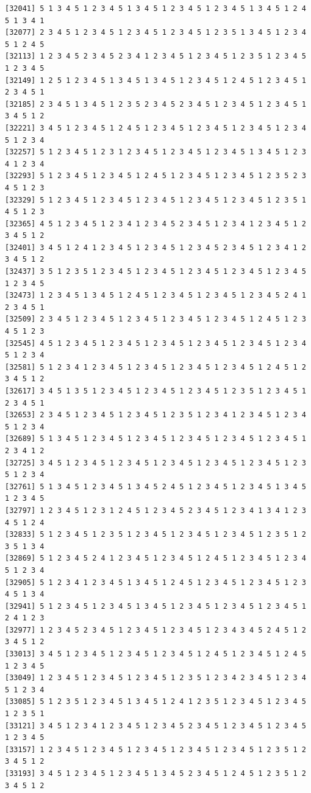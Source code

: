 \documentclass[
  english,
]{book}
\begin{document}
\begin{verbatim}
[32041] 5 1 3 4 5 1 2 3 4 5 1 3 4 5 1 2 3 4 5 1 2 3 4 5 1 3 4 5 1 2 4 5 1 3 4 1
[32077] 2 3 4 5 1 2 3 4 5 1 2 3 4 5 1 2 3 4 5 1 2 3 5 1 3 4 5 1 2 3 4 5 1 2 4 5
[32113] 1 2 3 4 5 2 3 4 5 2 3 4 1 2 3 4 5 1 2 3 4 5 1 2 3 5 1 2 3 4 5 1 2 3 4 5
[32149] 1 2 5 1 2 3 4 5 1 3 4 5 1 3 4 5 1 2 3 4 5 1 2 4 5 1 2 3 4 5 1 2 3 4 5 1
[32185] 2 3 4 5 1 3 4 5 1 2 3 5 2 3 4 5 2 3 4 5 1 2 3 4 5 1 2 3 4 5 1 3 4 5 1 2
[32221] 3 4 5 1 2 3 4 5 1 2 4 5 1 2 3 4 5 1 2 3 4 5 1 2 3 4 5 1 2 3 4 5 1 2 3 4
[32257] 5 1 2 3 4 5 1 2 3 1 2 3 4 5 1 2 3 4 5 1 2 3 4 5 1 3 4 5 1 2 3 4 1 2 3 4
[32293] 5 1 2 3 4 5 1 2 3 4 5 1 2 4 5 1 2 3 4 5 1 2 3 4 5 1 2 3 5 2 3 4 5 1 2 3
[32329] 5 1 2 3 4 5 1 2 3 4 5 1 2 3 4 5 1 2 3 4 5 1 2 3 4 5 1 2 3 5 1 4 5 1 2 3
[32365] 4 5 1 2 3 4 5 1 2 3 4 1 2 3 4 5 2 3 4 5 1 2 3 4 1 2 3 4 5 1 2 3 4 5 1 2
[32401] 3 4 5 1 2 4 1 2 3 4 5 1 2 3 4 5 1 2 3 4 5 2 3 4 5 1 2 3 4 1 2 3 4 5 1 2
[32437] 3 5 1 2 3 5 1 2 3 4 5 1 2 3 4 5 1 2 3 4 5 1 2 3 4 5 1 2 3 4 5 1 2 3 4 5
[32473] 1 2 3 4 5 1 3 4 5 1 2 4 5 1 2 3 4 5 1 2 3 4 5 1 2 3 4 5 2 4 1 2 3 4 5 1
[32509] 2 3 4 5 1 2 3 4 5 1 2 3 4 5 1 2 3 4 5 1 2 3 4 5 1 2 4 5 1 2 3 4 5 1 2 3
[32545] 4 5 1 2 3 4 5 1 2 3 4 5 1 2 3 4 5 1 2 3 4 5 1 2 3 4 5 1 2 3 4 5 1 2 3 4
[32581] 5 1 2 3 4 1 2 3 4 5 1 2 3 4 5 1 2 3 4 5 1 2 3 4 5 1 2 4 5 1 2 3 4 5 1 2
[32617] 3 4 5 1 3 5 1 2 3 4 5 1 2 3 4 5 1 2 3 4 5 1 2 3 5 1 2 3 4 5 1 2 3 4 5 1
[32653] 2 3 4 5 1 2 3 4 5 1 2 3 4 5 1 2 3 5 1 2 3 4 1 2 3 4 5 1 2 3 4 5 1 2 3 4
[32689] 5 1 3 4 5 1 2 3 4 5 1 2 3 4 5 1 2 3 4 5 1 2 3 4 5 1 2 3 4 5 1 2 3 4 1 2
[32725] 3 4 5 1 2 3 4 5 1 2 3 4 5 1 2 3 4 5 1 2 3 4 5 1 2 3 4 5 1 2 3 5 1 2 3 4
[32761] 5 1 3 4 5 1 2 3 4 5 1 3 4 5 2 4 5 1 2 3 4 5 1 2 3 4 5 1 3 4 5 1 2 3 4 5
[32797] 1 2 3 4 5 1 2 3 1 2 4 5 1 2 3 4 5 2 3 4 5 1 2 3 4 1 3 4 1 2 3 4 5 1 2 4
[32833] 5 1 2 3 4 5 1 2 3 5 1 2 3 4 5 1 2 3 4 5 1 2 3 4 5 1 2 3 5 1 2 3 5 1 3 4
[32869] 5 1 2 3 4 5 2 4 1 2 3 4 5 1 2 3 4 5 1 2 4 5 1 2 3 4 5 1 2 3 4 5 1 2 3 4
[32905] 5 1 2 3 4 1 2 3 4 5 1 3 4 5 1 2 4 5 1 2 3 4 5 1 2 3 4 5 1 2 3 4 5 1 3 4
[32941] 5 1 2 3 4 5 1 2 3 4 5 1 3 4 5 1 2 3 4 5 1 2 3 4 5 1 2 3 4 5 1 2 4 1 2 3
[32977] 1 2 3 4 5 2 3 4 5 1 2 3 4 5 1 2 3 4 5 1 2 3 4 3 4 5 2 4 5 1 2 3 4 5 1 2
[33013] 3 4 5 1 2 3 4 5 1 2 3 4 5 1 2 3 4 5 1 2 4 5 1 2 3 4 5 1 2 4 5 1 2 3 4 5
[33049] 1 2 3 4 5 1 2 3 4 5 1 2 3 4 5 1 2 3 5 1 2 3 4 2 3 4 5 1 2 3 4 5 1 2 3 4
[33085] 5 1 2 3 5 1 2 3 4 5 1 3 4 5 1 2 4 1 2 3 5 1 2 3 4 5 1 2 3 4 5 1 2 3 5 1
[33121] 3 4 5 1 2 3 4 1 2 3 4 5 1 2 3 4 5 2 3 4 5 1 2 3 4 5 1 2 3 4 5 1 2 3 4 5
[33157] 1 2 3 4 5 1 2 3 4 5 1 2 3 4 5 1 2 3 4 5 1 2 3 4 5 1 2 3 5 1 2 3 4 5 1 2
[33193] 3 4 5 1 2 3 4 5 1 2 3 4 5 1 3 4 5 2 3 4 5 1 2 4 5 1 2 3 5 1 2 3 4 5 1 2

\end{verbatim}
\end{document}
